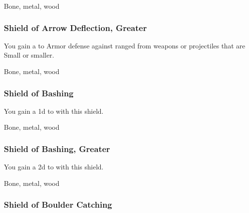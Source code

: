  


 Bone, metal, wood


\lowercase{\hypertarget{item:Shield of Arrow Deflection, Greater}{}}\label{item:Shield of Arrow Deflection, Greater}
\hypertarget{item:Shield of Arrow Deflection, Greater}{\subsubsection{Shield of Arrow Deflection, Greater\hfill{}}}

You gain a   to Armor defense against ranged  from weapons or projectiles that are Small or smaller.



 


 Bone, metal, wood


\lowercase{\hypertarget{item:Shield of Bashing}{}}\label{item:Shield of Bashing}
\hypertarget{item:Shield of Bashing}{\subsubsection{Shield of Bashing\hfill{}}}

You gain a \plus1d  to  with this shield.



 Bone, metal, wood


\lowercase{\hypertarget{item:Shield of Bashing, Greater}{}}\label{item:Shield of Bashing, Greater}
\hypertarget{item:Shield of Bashing, Greater}{\subsubsection{Shield of Bashing, Greater\hfill{}}}

You gain a \plus2d  to  with this shield.



 Bone, metal, wood


\lowercase{\hypertarget{item:Shield of Boulder Catching}{}}\label{item:Shield of Boulder Catching}
\hypertarget{item:Shield of Boulder Catching}{\subsubsection{Shield of Boulder Catching\hfill{}}}

